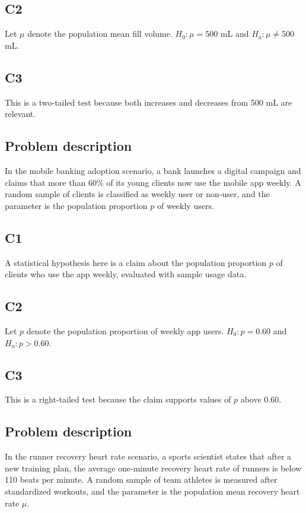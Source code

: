 \begin{ExamProblems}
		\subsection*{C2}
		Let \(\mu\) denote the population mean fill volume. \(H_0\colon \mu = 500\) mL and \(H_a\colon \mu \neq 500\) mL.

		\subsection*{C3}
		This is a two-tailed test because both increases and decreases from 500 mL are relevant.

		\item
		\subsection*{Problem description}
		In the mobile banking adoption scenario, a bank launches a digital campaign and claims that more than 60\% of its young clients now use the mobile app weekly. A random sample of clients is classified as weekly user or non-user, and the parameter is the population proportion \(p\) of weekly users.

		\subsection*{C1}
		A statistical hypothesis here is a claim about the population proportion \(p\) of clients who use the app weekly, evaluated with sample usage data.

		\subsection*{C2}
		Let \(p\) denote the population proportion of weekly app users. \(H_0\colon p = 0.60\) and \(H_a\colon p > 0.60\).

		\subsection*{C3}
		This is a right-tailed test because the claim supports values of \(p\) above 0.60.

		\item
		\subsection*{Problem description}
		In the runner recovery heart rate scenario, a sports scientist states that after a new training plan, the average one-minute recovery heart rate of runners is below 110 beats per minute. A random sample of team athletes is measured after standardized workouts, and the parameter is the population mean recovery heart rate \(\mu\).


\end{ExamProblems}
